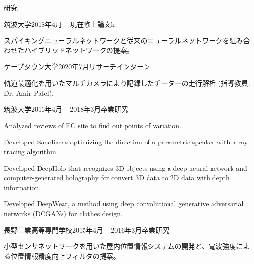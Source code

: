 \documentclass{resume} %
\begin{document}
\begin{rSection}{研究}

    \begin{rSubsection}{筑波大学}{2018年4月 -- 現在}{修士論文h}{}
    \item スパイキングニューラルネットワークと従来のニューラルネットワークを組み合わせたハイブリッドネットワークの提案。
    \end{rSubsection}

    \begin{rSubsection}{ケープタウン大学}{2020年7月}{リサーチインターン}{}
    \item 軌道最適化を用いたマルチカメラにより記録したチーターの走行解析 (指導教員: \href{https://scholar.google.co.za/citations?user=RxMigV4AAAAJ&view_op=list_works&sortby=pubdate}{Dr. Amir Patel}).
    \end{rSubsection}

    \begin{rSubsection}{筑波大学}{2016年4月 -- 2018年3月}{卒業研究}{}
    \item Analyzed reviews of EC site to find out points of variation.
    \item Developed Sonoliards optimizing the direction of a parametric speaker with a ray tracing algorithm.
    \item Developed DeepHolo that recognizes 3D objects using a deep neural network and computer-generated holography for convert 3D data to 2D data with depth information.
    \item Developed DeepWear, a method using deep convolutional generative adversarial networks (DCGANs) for clothes design.
    \end{rSubsection}

    \begin{rSubsection}{長野工業高等専門学校}{2015年4月 -- 2016年3月}{卒業研究}{}
    \item 小型センサネットワークを用いた屋内位置情報システムの開発と、電波強度による位置情報精度向上フィルタの提案。
    \end{rSubsection}

\end{rSection}

\end{document}
